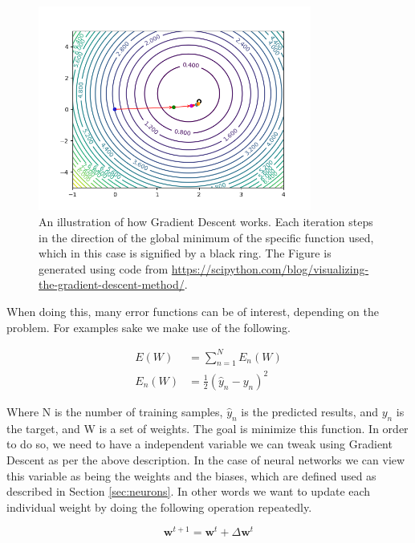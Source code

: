 \begin{figure}
    \centering
    \includegraphics[width=0.8\textwidth]{./pictures/method/GradientDesc.png}
    \caption{An illustration of how Gradient Descent works. Each iteration steps
        in the direction of the global minimum of the specific function used,
        which in this case is signified by a black ring. The Figure is generated
        using code from
        \url{https://scipython.com/blog/visualizing-the-gradient-descent-method/}.}
    \label{fig:grad}
\end{figure}

When doing this, many error functions can be of interest, depending on the
problem. For examples sake we make use of the following.

\begin{align}
E(W) &= \sum_{n=1}^N E_n(W)\\
E_n(W) &= \frac{1}{2}(\hat{y}_n - y_n)^2
\end{align}

Where N is the number of training samples, $\hat{y}_n$ is the predicted results,
and $y_n$ is the target, and W is a set of weights. The goal is minimize
this function. In order to do so, we need to have a independent variable we
can tweak using Gradient Descent as per the above description. In the case of
neural networks we can view this variable as being the weights and the biases,
which are defined used as described in Section \ref{sec:neurons}. In other
words we want to update each individual weight by doing the following operation
repeatedly.

\begin{equation}\label{eq:update}
\pmb{w}^{t+1} = \pmb{w}^t + \Delta \pmb{w}^t
\end{equation}

